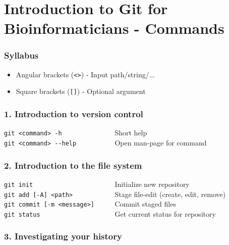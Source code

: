 \documentclass[12pt]{report}
\begin{document}
\section*{Introduction to Git for Bioinformaticians - Commands}

\subsubsection*{Syllabus}

\begin{itemize}
	\item Angular brackets (\verb$<>$) - Input path/string/...
	\item Square brackets (\verb$[]$) - Optional argument
\end{itemize}



\subsubsection{1. Introduction to version control}

\verb$git <command> -h              $ \hspace*{25pt} Short help\\
\verb$git <command> --help          $ \hspace*{25pt} Open man-page for command

\subsubsection{2. Introduction to the file system}

\verb$git init                      $ \hspace*{25pt} Initialize new repository \\
\verb$git add [-A] <path>           $ \hspace*{25pt} Stage file-edit (create, edit, remove) \\
\verb$git commit [-m <message>]     $ \hspace*{25pt} Commit staged files \\
\verb$git status                    $ \hspace*{25pt} Get current status for repository

\subsubsection{3. Investigating your history}
\end{document}
